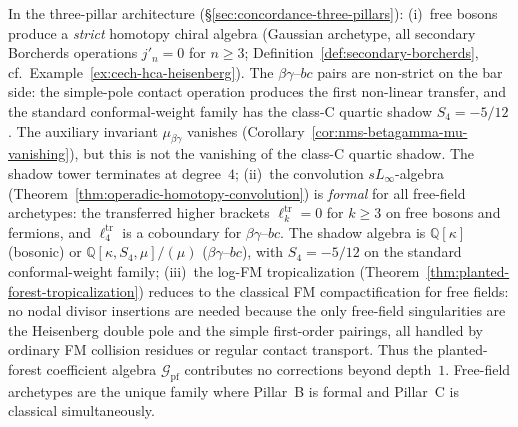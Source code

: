 \begin{remark}
\label{rem:free-fields-three-pillar}
In the three-pillar architecture
(\S\ref{sec:concordance-three-pillars}):
(i)~free bosons produce a \emph{strict} homotopy chiral algebra
(Gaussian archetype, all secondary Borcherds operations
$j'_n = 0$ for $n \geq 3$;
Definition~\ref{def:secondary-borcherds},
cf.\ Example~\ref{ex:cech-hca-heisenberg}). The $\beta\gamma$--$bc$
pairs are non-strict on the bar side: the simple-pole contact
operation produces the first non-linear transfer, and the standard
conformal-weight family has the class-C quartic shadow
$S_4=-5/12$. The auxiliary invariant
$\mu_{\beta\gamma}$ vanishes
(Corollary~\ref{cor:nms-betagamma-mu-vanishing}), but this is not the
vanishing of the class-C quartic shadow. The shadow tower terminates
at degree~$4$;
(ii)~the convolution $sL_\infty$-algebra
(Theorem~\ref{thm:operadic-homotopy-convolution}) is \emph{formal}
for all free-field archetypes: the transferred higher brackets
$\ell_k^{\mathrm{tr}} = 0$ for $k \geq 3$ on free bosons and
fermions, and $\ell_4^{\mathrm{tr}}$ is a coboundary for
$\beta\gamma$--$bc$. The shadow algebra is
$\mathbb{Q}[\kappa]$ (bosonic) or
$\mathbb{Q}[\kappa,S_4,\mu]/(\mu)$ ($\beta\gamma$--$bc$), with
$S_4=-5/12$ on the standard conformal-weight family;
(iii)~the log-FM tropicalization
(Theorem~\ref{thm:planted-forest-tropicalization}) reduces to the
classical FM compactification for free fields: no nodal divisor
insertions are needed because the only free-field singularities are the
Heisenberg double pole and the simple first-order pairings, all handled
by ordinary FM collision residues or regular contact transport. Thus the
planted-forest coefficient algebra
$\mathcal{G}_{\mathrm{pf}}$ contributes no corrections beyond
depth~$1$.
Free-field archetypes are the unique family where Pillar~B is formal
and Pillar~C is classical simultaneously.
\end{remark}

